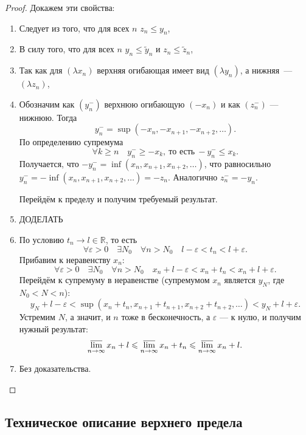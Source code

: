 \begin{proof}
	Докажем эти свойства:
	\begin{enumerate}
		\item Следует из того, что для всех \(n\) \(z_n \leqslant y_n\),
		\item В силу того, что для всех \(n\) \(y_n \leqslant \widetilde{y}_n\) и \(z_n \leqslant \widetilde{z}_n\),
		\item Так как для \((\lambda x_n)\) верхняя огибающая имеет вид \((\lambda y_n)\), а нижняя~--- \((\lambda z_n)\),
		\item Обозначим как \((y_n^-)\) верхнюю огибающую \((-x_n)\) и как \((z_n^-)\) --- нижнюю. Тогда \[
			y_n^- = \sup(-x_n, -x_{n + 1}, -x_{n + 2}, \ldots).
		\]
		По определению супремума \[
			\forall k \geqslant n \quad y_n^- \geqslant -x_k, \ \text{то есть} \ -y_n^- \leqslant x_k.
		\]
		Получается, что \(-y_n^- = \inf(x_n, x_{n + 1}, x_{n + 2}, \ldots)\), что равносильно \linebreak \(y_n^- = -\inf(x_n, x_{n + 1}, x_{n + 2}, \ldots) = -z_n\). Аналогично \(z_n^- = -y_n\).
		
		Перейдём к пределу и получим требуемый результат.
		\item ДОДЕЛАТЬ
		\item По условию \(t_n \to l \in \mathbb{R}\), то есть \[
			\forall \varepsilon > 0 \quad \exists N_0 \quad \forall n > N_0 \quad l - \varepsilon < t_n < l + \varepsilon.
		\]
		Прибавим к неравенству \(x_n\): \[
			\forall \varepsilon > 0 \quad \exists N_0 \quad \forall n > N_0 \quad x_n + l - \varepsilon < x_n + t_n < x_n + l + \varepsilon.
		\]
		Перейдём к супремуму в неравенстве (супремумом \(x_n\) является \(y_{N}\), где \(N_0 < N < n\)): \[
			y_N + l - \varepsilon < \sup(x_n + t_n, x_{n + 1} + t_{n + 1}, x_{n + 2} + t_{n + 2}, \ldots) < y_N + l + \varepsilon.
		\]
		Устремим \(N\), а значит, и \(n\) тоже в бесконечность, а \(\varepsilon\) --- к нулю, и получим нужный результат: \[
			\varlimsup\limits_{n \to \infty} x_n + l \leqslant \varlimsup\limits_{n \to \infty} x_n + t_n \leqslant \varlimsup\limits_{n \to \infty} x_n + l.
		\]
		\item Без доказательства.
	\end{enumerate}
\end{proof}

\subsection{Техническое описание верхнего предела}


